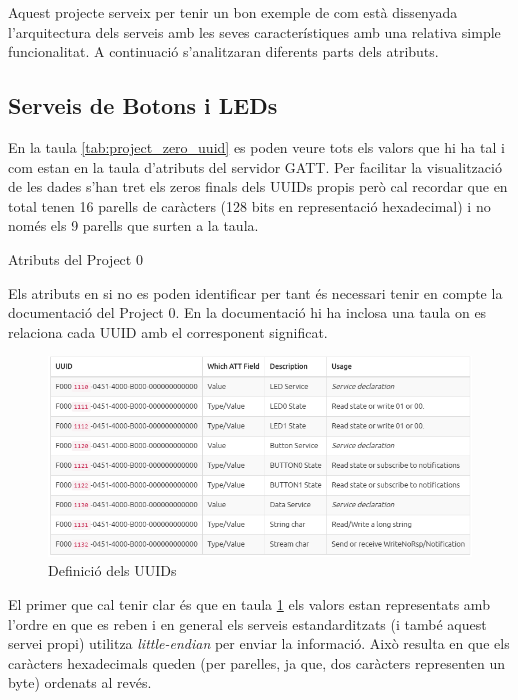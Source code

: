 Aquest projecte serveix per tenir un bon exemple de com està dissenyada l'arquitectura dels serveis amb les seves característiques amb una relativa simple funcionalitat. A continuació s'analitzaran diferents parts dels atributs.

\subsection{Serveis de Botons i LEDs}

En la taula \ref{tab:project_zero_uuid} es poden veure tots els valors que hi ha tal i com estan en la taula d'atributs del servidor GATT.
Per facilitar la visualització de les dades s'han tret els zeros finals dels UUIDs propis però cal recordar que en total tenen 16 parells de caràcters (128 bits en representació hexadecimal) i no només els 9 parells que surten a la taula.
\begin{table}[h!]
	\begin{center}
		\caption{Atributs del Project 0}
		\label{tab:project_zero_uuid}
	\end{center}
\end{table}
Els atributs en si no es poden identificar per tant és necessari tenir en compte la documentació del Project 0.
En la documentació hi ha inclosa una taula on es relaciona cada UUID amb el corresponent significat.

\begin{figure}[h!]
	\begin{center}
		\includegraphics[width=\textwidth]{./images/Project_0_UUID.png}
		\caption{Definició dels UUIDs}
		\label{project0_table}
	\end{center}
\end{figure}

El primer que cal tenir clar és que en taula \ref{project0_table} els valors estan representats amb l'ordre en que es reben i en general els serveis estandarditzats (i també aquest servei propi) utilitza \textit{little-endian} per enviar la informació.
Això resulta en que els caràcters hexadecimals queden (per parelles, ja que, dos caràcters representen un byte) ordenats al revés.

